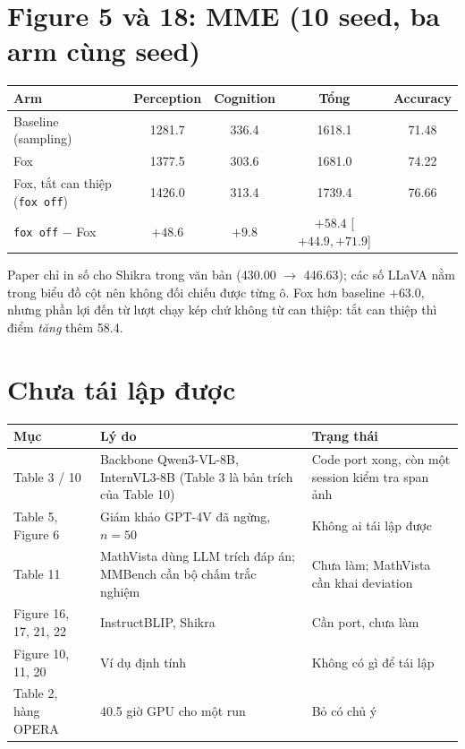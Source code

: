 \documentclass[10pt,a4paper]{article}
\begin{document}
\section{Figure 5 và 18: MME (10 seed, ba arm cùng seed)}
\begin{center}\small
\begin{tabular}{@{}lcccc@{}}
\toprule
Arm & Perception & Cognition & Tổng & Accuracy \\
\midrule
Baseline (sampling) & 1281.7 & 336.4 & 1618.1 & 71.48 \\
Fox & 1377.5 & 303.6 & 1681.0 & 74.22 \\
Fox, tắt can thiệp (\texttt{fox off}) & 1426.0 & 313.4 & 1739.4 & 76.66 \\
\midrule
\texttt{fox off} $-$ Fox & $+48.6$ & $+9.8$ & $+58.4$ [$+44.9,+71.9$] & \\
\bottomrule
\end{tabular}
\end{center}
\noindent\small Paper chỉ in số cho Shikra trong văn bản (430.00 $\to$ 446.63); các số LLaVA nằm trong biểu đồ cột nên không đối chiếu được từng ô. Fox hơn baseline $+63.0$, nhưng phần lợi đến từ lượt chạy kép chứ không từ can thiệp: tắt can thiệp thì điểm \emph{tăng} thêm 58.4.

\section{Chưa tái lập được}
\begin{center}\small
\begin{tabular}{@{}l L{5cm} L{6.4cm}@{}}
\toprule
Mục & Lý do & Trạng thái \\
\midrule
Table 3 / 10 & Backbone Qwen3-VL-8B, InternVL3-8B (Table 3 là bản trích của Table 10) & Code port xong, còn một session kiểm tra span ảnh \\
Table 5, Figure 6 & Giám khảo GPT-4V đã ngừng, $n=50$ & Không ai tái lập được \\
Table 11 & MathVista dùng LLM trích đáp án; MMBench cần bộ chấm trắc nghiệm & Chưa làm; MathVista cần khai deviation \\
Figure 16, 17, 21, 22 & InstructBLIP, Shikra & Cần port, chưa làm \\
Figure 10, 11, 20 & Ví dụ định tính & Không có gì để tái lập \\
Table 2, hàng OPERA & 40.5 giờ GPU cho một run & Bỏ có chủ ý \\
\bottomrule
\end{tabular}
\end{center}
\end{document}

